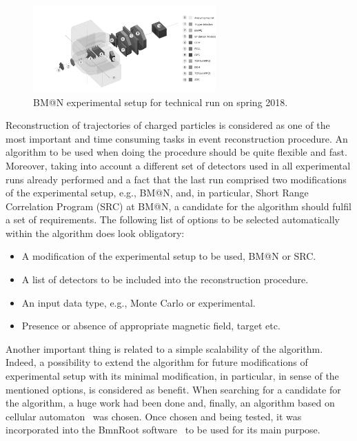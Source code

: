 \documentclass{webofc}
\begin{document}
\begin{figure}[h]
	\centering
	\includegraphics[width=7cm,clip]{BMN_setup_RunSpring2018_front_labels}
	\caption{BM@N experimental setup for technical run on spring 2018.}
	\label{fig-1}
\end{figure}
Reconstruction of trajectories of charged particles is considered as one of the most important and time consuming tasks in event reconstruction procedure.
An algorithm to be used when doing the procedure should be quite flexible and fast. Moreover, taking into account a different set of detectors used in all experimental
runs already performed and a fact that the last run comprised two modifications of the experimental setup, e.g., BM@N, and, in particular, Short Range Correlation Program (SRC)
at BM@N, a candidate for the algorithm should fulfil a set of requirements. The following list of options to be selected automatically within the algorithm does look obligatory: 
\begin{itemize}
	\item A modification of the experimental setup to be used, BM@N or SRC.
	\item A list of detectors to be included into the reconstruction procedure.
	\item An input data type, e.g., Monte Carlo or experimental. 
	\item Presence or absence of appropriate magnetic field, target etc.
\end{itemize}
Another important thing is related to a simple scalability of the algorithm. Indeed, a possibility to extend the algorithm for future modifications of experimental setup
with its minimal modification, in particular, in sense of the mentioned options, is considered as benefit. When searching for a candidate for the algorithm,
a huge work had been done and, finally, an algorithm based on cellular automaton~\cite{CA} was chosen. Once chosen and being tested, it was incorporated into
the BmnRoot software~\cite{soft, fairroot} to be used for its main purpose.
\end{document}
